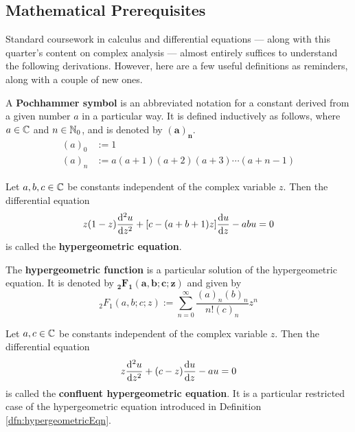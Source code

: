 \documentclass[titlepage]{article}
\numberwithin{equation}{section}
\begin{document}
\subsection{Mathematical Prerequisites}\label{sss:prereqs}
Standard coursework in calculus and differential equations --- along with this quarter's content on complex analysis --- almost entirely suffices to understand the following derivations. However, here are a few useful definitions as reminders, along with a couple of new ones.
\begin{definition}
    A \textbf{Pochhammer symbol} is an abbreviated notation for a constant derived from a given number $a$ in a particular way. It is defined inductively as follows, where $a\in\mathbb{C}$ and $n\in\mathbb{N}_0$, and is denoted by $\bm{(a)_n}$.
    \begin{align*}
        (a)_0 &:= 1\\
        (a)_n &:= a(a+1)(a+2)(a+3)\cdots(a+n-1)\tag{$n=1,2,3,\dots$}
    \end{align*}
\end{definition}
\begin{definition}\label{dfn:hypergeometricEqn}
    Let $a,b,c\in\mathbb{C}$ be constants independent of the complex variable $z$. Then the differential equation
    \begin{equation*}
        z(1-z)\dv[2]{u}{z}+[c-(a+b+1)z]\dv{u}{z}-abu = 0
    \end{equation*}
    is called the \textbf{hypergeometric equation}.
\end{definition}
\begin{definition}
    The \textbf{hypergeometric function} is a particular solution of the hypergeometric equation. It is denoted by $\bm{{}_2F_1(a,b;c;z)}$ and given by
    \begin{equation*}
        {}_2F_1(a,b;c;z) := \sum_{n=0}^\infty\frac{(a)_n(b)_n}{n!(c)_n}z^n
    \end{equation*}
\end{definition}
\begin{definition}\label{dfn:hypergeometricEqnC}
    Let $a,c\in\mathbb{C}$ be constants independent of the complex variable $z$. Then the differential equation
    \begin{equation*}
        z\dv[2]{u}{z}+(c-z)\dv{u}{z}-au = 0
    \end{equation*}
    is called the \textbf{confluent hypergeometric equation}. It is a particular restricted case of the hypergeometric equation introduced in Definition \ref{dfn:hypergeometricEqn}.
\end{definition}
\end{document}
